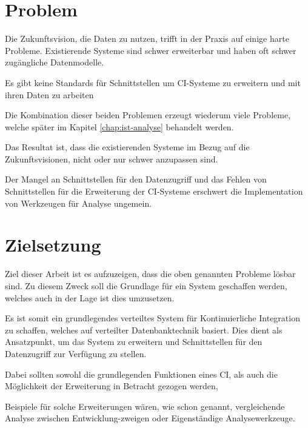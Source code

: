 




\section{Problem}

Die Zukunftsvision, die Daten zu nutzen,
trifft in der Praxis auf einige harte Probleme.
Existierende Systeme sind schwer erweiterbar und haben oft schwer zugängliche Datenmodelle.

Es gibt keine Standards für Schnittstellen um CI-Systeme zu erweitern und mit ihren Daten zu arbeiten

Die Kombination dieser beiden Problemen erzeugt wiederum viele Probleme,
welche später im Kapitel \ref{chap:ist-analyse} behandelt werden.

Das Resultat ist, dass die existierenden Systeme im Bezug auf die Zukunftsvisionen,
nicht oder nur schwer anzupassen sind.

Der Mangel an Schnittstellen für den Datenzugriff und
das Fehlen von Schnittstellen für die Erweiterung der CI-Systeme
erschwert die Implementation von Werkzeugen für Analyse ungemein.


\section{Zielsetzung}
Ziel dieser Arbeit ist es  aufzuzeigen, dass die oben genannten Probleme lösbar sind.
Zu diesem Zweck soll die Grundlage für ein System geschaffen werden,
welches auch in der Lage ist dies umzusetzen.

Es ist somit ein grundlegendes verteiltes System für Kontinuierliche Integration zu schaffen,
welches auf verteilter Datenbanktechnik basiert.
Dies dient als Ansatzpunkt, um das System zu erweitern und
Schnittstellen für den Datenzugriff zur Verfügung zu stellen.

Dabei sollten sowohl die grundlegenden Funktionen eines CI,
als auch die Möglichkeit der Erweiterung in Betracht gezogen werden,

Beispiele für solche Erweiterungen wären, wie schon genannt,
vergleichende Analyse zwischen Entwicklung-zweigen oder Eigenständige Analysewerkzeuge.

